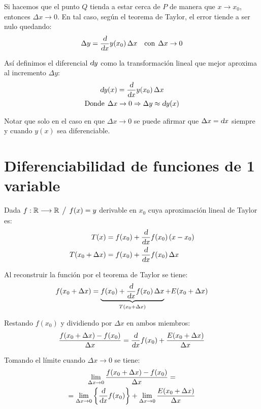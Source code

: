 Si hacemos que el punto $Q$ tienda a estar cerca de $P$ de manera que $x \to x_0$, entonces $\Delta x \to 0$.
En tal caso, según el teorema de Taylor, el error tiende a ser nulo quedando:
\begin{equation*}
    \Delta y = \frac{\textsl{d}}{\textsl{d} x} y(x_0) \, \Delta x \quad \textrm{con} \hspace{1ex} \Delta x \to 0
\end{equation*}

Así definimos el diferencial $\textsl{d} y$ como la transformación lineal que mejor aproxima al incremento $\Delta y$:
\begin{gather*}
    \textsl{d} y(x) = \dfrac{\textsl{d}}{\textsl{d} x} y(x_0) \, \Delta x
    \\
    \textrm{Donde} \hspace{1ex} \Delta x \to 0 \Rightarrow \Delta y \approx \textsl{d} y(x)
\end{gather*}

Notar que solo en el caso en que $\Delta x \to 0$ se puede afirmar que $\Delta x = \textsl{d} x$ siempre y cuando $y(x)$ sea diferenciable.


\section{Diferenciabilidad de funciones de 1 variable}

Dada $f: \mathbb{R} \longrightarrow \mathbb{R} \hspace{1ex} \big/ \hspace{1ex} f(x)=y$ derivable en $x_0$ cuya aproximación lineal de Taylor es:
\begin{align*}
    T(x) &= f(x_0)+\frac{\textsl{d}}{\textsl{d} x} f(x_0) \left(x-x_0\right)
    \\
    T(x_0 + \Delta x) &= f(x_0)+\frac{\textsl{d}}{\textsl{d} x} f(x_0) \, \Delta x
\end{align*}

Al reconstruir la función por el teorema de Taylor se tiene:
\begin{equation*}
    f(x_0 + \Delta x) = \underbrace{f(x_0)+\frac{\textsl{d}}{\textsl{d} x} f(x_0) \, \Delta x}_{T(x_0 + \Delta x)} + E(x_0 + \Delta x)
\end{equation*}

Restando $f(x_0)$ y dividiendo por $\Delta x$ en ambos miembros:
\begin{equation*}
    \frac{f(x_0 + \Delta x)-f(x_0)}{\Delta x} = \frac{\textsl{d}}{\textsl{d} x} f(x_0) + \frac{E(x_0 + \Delta x)}{\Delta x}
\end{equation*}

Tomando el límite cuando $\Delta x \to 0$ se tiene:
\begin{multline*}
    \lim_{\Delta x \to 0} \frac{f(x_0 + \Delta x)-f(x_0)}{\Delta x} =
    \\
    = \lim_{\Delta x \to 0} { \left\{ { \frac{\textsl{d}}{\textsl{d} x} f(x_0) } \right\} } + \lim_{\Delta x \to 0} \frac{E(x_0 + \Delta x)}{\Delta x}
\end{multline*}

